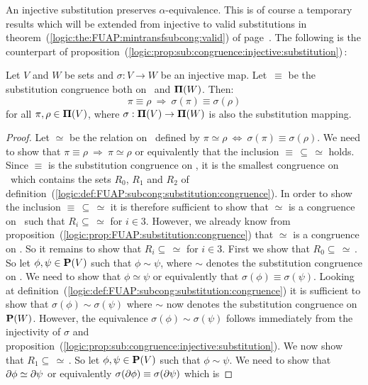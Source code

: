 An injective substitution preserves $\alpha$-equivalence. This is of
course a temporary results which will be extended from injective to
valid substitutions in
theorem~(\ref{logic:the:FUAP:mintransfsubcong:valid}) of
page~\pageref{logic:the:FUAP:mintransfsubcong:valid}. The following
is the counterpart of
proposition~(\ref{logic:prop:sub:congruence:injective:substitution})\,:
\begin{prop}\label{logic:prop:FUAP:charsubcong:injective:substitution}
Let $V$ and $W$ be sets and $\sigma:V\to W$ be an injective map.
Let~$\equiv$ be the substitution congruence both on \pvs\ and
${\bf\Pi}(W)$. Then:
    \[
    \pi\equiv\rho\ \Rightarrow\ \sigma(\pi)\equiv\sigma(\rho)
    \]
for all $\pi,\rho\in\mbox{${\bf\Pi}(V)$}$, where $\sigma:\mbox{${\bf\Pi}(V)$}\to{\bf\Pi}(W)$ is also
the substitution mapping.
\end{prop}
\begin{proof}
Let $\simeq$ be the relation on \pvs\ defined by $\pi\simeq\rho\
\Leftrightarrow\ \sigma(\pi)\equiv\sigma(\rho)$. We need to show
that $\pi\equiv\rho\ \Rightarrow\ \pi\simeq\rho$ or equivalently
that the inclusion $\equiv\,\subseteq\,\simeq$ holds. Since $\equiv$
is the substitution congruence on \pvs, it is the smallest
congruence on \pvs\ which contains the sets $R_{0}$, $R_{1}$ and
$R_{2}$ of
definition~(\ref{logic:def:FUAP:subcong:substitution:congruence}).
In order to show the inclusion $\equiv\,\subseteq\,\simeq$ it is
therefore sufficient to show that $\simeq$ is a congruence on \pvs\
such that $R_{i}\subseteq\,\simeq$ for $i\in 3$. However, we already
know from
proposition~(\ref{logic:prop:FUAP:substitution:congruence}) that
$\simeq$ is a congruence on \pvs. So it remains to show that
$R_{i}\subseteq\,\simeq$ for $i\in 3$. First we show that
$R_{0}\subseteq\,\simeq$\,. So let $\phi,\psi\in\mbox{${\bf P}(V)$}$ such that
$\phi\sim\psi$, where $\sim$ denotes the substitution congruence on
\pv. We need to show that $\phi\simeq\psi$ or equivalently that
$\sigma(\phi)\equiv\sigma(\psi)$. Looking at
definition~(\ref{logic:def:FUAP:subcong:substitution:congruence}) it
is sufficient to show that $\sigma(\phi)\sim\sigma(\psi)$ where
$\sim$ now denotes the substitution congruence on ${\bf P}(W)$.
However, the equivalence $\sigma(\phi)\sim\sigma(\psi)$ follows
immediately from the injectivity of $\sigma$ and
proposition~(\ref{logic:prop:sub:congruence:injective:substitution}).
We now show that $R_{1}\subseteq\,\simeq$\,. So let
$\phi,\psi\in\mbox{${\bf P}(V)$}$ such that $\phi\sim\psi$. We need to show that
$\mbox{$\partial$}\phi\simeq\mbox{$\partial$}\psi$ or equivalently
$\sigma(\mbox{$\partial$}\phi)\equiv\sigma(\mbox{$\partial$}\psi)$ which is

\end{proof}
